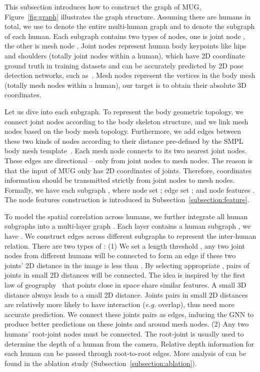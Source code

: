 \documentclass[runningheads]{llncs}
\begin{document}
This subsection introduces how to construct the graph of MUG, Figure~\ref{fig:graph} illustrates the graph structure.
Assuming there are  humans in total, we use  to denote the entire multi-human graph and  to denote the subgraph of each human. Each subgraph contains two types of nodes, one is joint node , the other is mesh node .  Joint nodes represent human body keypoints like hips and shoulders (totally  joint nodes within a human), which have 2D coordinate ground truth in training datasets and can be accurately predicted by 2D pose detection networks, such as~\cite{he2017mask,sun2019deep}. Mesh nodes represent the vertices in the body mesh (totally  mesh nodes within a human), our target is to obtain their absolute 3D coordinates. 

Let us dive into each subgraph. To represent the body geometric topology, we connect joint nodes according to the body skeleton structure, and we link mesh nodes based on the body mesh topology. Furthermore, we add edges between these two kinds of nodes according to their distance pre-defined by the SMPL body mesh template~\cite{loper2015smpl}. Each mesh node connects to its two nearest joint nodes. These edges are directional -- only from joint nodes to mesh nodes. The reason is that the input of MUG only has 2D coordinates of joints. Therefore, coordinates information should be transmitted strictly from joint nodes to mesh nodes.
Formally, we have each subgraph , where node set ; edge set ; and node features . The node features construction is introduced in Subsection~\ref{subsection:feature}.

To model the spatial correlation across humans, we further integrate all human subgraphs into a multi-layer graph . 
Each layer contains a human subgraph , we have . 
We construct edges  across different subgraphs to represent the inter-human relation. There are two types of : 
(1) We set a length threshold , any two joint nodes from different humans will be connected to form an edge if these two joints' 2D distance in the image is less than . 
By selecting appropriate , pairs of joints in small 2D distances will be connected.
The idea is inspired by the first law of geography~\cite{tobler1970computer} that points close in space share similar features.
A small 3D distance always leads to a small 2D distance. 
Joints pairs in small 2D distances are relatively more likely to have interaction (\textit{e.g.} overlap), thus need more accurate prediction.
 We connect these joints pairs as edges, inducing the GNN to produce better predictions on these joints and around mesh nodes.
(2) Any two humans' root-joint nodes must be connected. The root-joint is usually used to determine the depth of a human from the camera. Relative depth information for each human can be passed through root-to-root edges. More analysis of  can be found in the ablation study (Subsection~\ref{subsection:ablation}).
\end{document}
